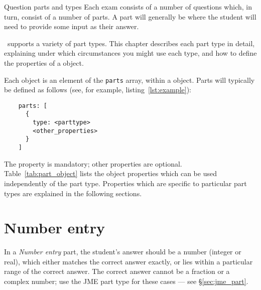 %
%
%

\begin{chapter}{\label{cha:question_parts}Question parts and types}
  Each exam consists of a number of questions which, in turn, consist of a
  number of parts.  A part will generally be where the student will need to
  provide some input as their answer.

  \numbas\ supports a variety of part types.  This chapter describes each
  part type in detail, explaining under which circumstances you might use each
  type, and how to define the properties of a  object.
  
  Each  object is an element of the \verb"parts" array, within
  a  object.  Parts will typically be defined as follows
  (see, for example, listing~\ref{lst:example}):
  \begin{Verbatim}
    parts: [
      {
        type: <parttype>
        <other_properties>
      }
    ]
  \end{Verbatim}
  The  property is mandatory; other properties are optional.
  Table~\ref{tab:part_object} lists the  object properties
  which can be used independently of the part type.  Properties which are
  specific to particular part types are explained in the following sections.

  \section{\label{sec:number_entry_part}Number entry}
  In a \emph{Number entry} part, the student's answer should be a number
  (integer or real), which either matches the correct answer exactly, or lies
  within a particular range of the correct answer.  The correct answer cannot
  be a fraction or a complex number; use the JME part type for these cases ---
  see \S\ref{sec:jme_part}.


\end{chapter}
